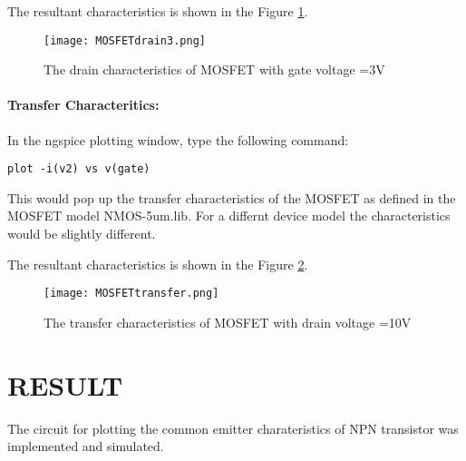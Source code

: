 The resultant characteristics is shown in the Figure \ref{MOSFETdrain3}.
\begin{figure}[h]
\centering
\texttt{[image: MOSFETdrain3.png]}
\caption{The drain characteristics of MOSFET with gate voltage =3V }
\label{MOSFETdrain3}
\end{figure}

\paragraph{Transfer Characteritics:} In the ngspice plotting window, type the following command:

\texttt{plot -i(v2) vs v(gate)}

This would pop up the transfer characteristics of the MOSFET as defined in the MOSFET model NMOS-5um.lib. For a differnt device model the characteristics would be slightly different.

The resultant characteristics is shown in the Figure \ref{MOSFETtransfer}.


\begin{figure}[h]
\centering
\texttt{[image: MOSFETtransfer.png]}
\caption{The transfer characteristics of MOSFET with drain voltage =10V }
\label{MOSFETtransfer}
\end{figure}


\section*{RESULT}
The circuit for plotting the common emitter charateristics of NPN transistor was implemented and simulated.


